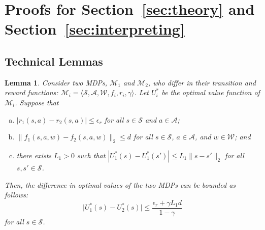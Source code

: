 \documentclass[11pt, notitlepage]{article}
\newcommand{\1}{\mathbbm{1}}
\newtheorem{lemma}{Lemma}[section]
\begin{document}
    



    
    












\section{Proofs for Section~\ref{sec:theory} and Section~\ref{sec:interpreting}}
\subsection{Technical Lemmas}

\begin{lemma}
    \label{lemma:U_V}
    Consider two MDPs, $\mathcal M_1$ and $\mathcal M_2$, who differ in their transition and reward functions: $\mathcal M_i = \langle \mathcal{S}, \mathcal{A}, \mathcal{W}, f_i, r_i, \gamma \rangle$. Let $U_i^*$ be the optimal value function of $\mathcal M_i$. Suppose that
    \begin{enumerate}[(a)]
        \item $|r_1(s,a) - r_2(s,a)| \leq \epsilon_r$ for all $s\in\mathcal{S}$ and $a\in\mathcal{A}$;
        \item $\|f_1(s,a,w) - f_2(s,a,w)\|_2 \leq d$ for all $s \in \mathcal S$, $a \in \mathcal A$, and $w \in \mathcal W$; and
        \item there exists $L_1 > 0$ such that $|U_1^*(s) - U_1^*(s')| \leq L_1 \|s-s'\|_2$ for all $s, s'\in\mathcal{S}$.
    \end{enumerate}
    Then, the difference in optimal values of the two MDPs can be bounded as follows:
    \[
        \bigl|U_1^*(s)-U_2^*(s)\bigr| \leq \frac{\epsilon_r + \gamma L_1 d}{1-\gamma}
    \]
    for all $s \in \mathcal S$.
\end{lemma}
\end{document}
